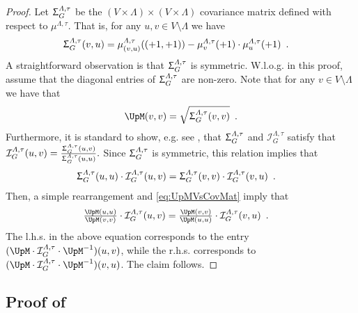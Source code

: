 \documentclass[11pt,reqno]{amsart}
\numberwithin{equation}{section}
\newcommand{\cI}{{\mathcal{I}}}
\newcommand{\electricviolet}[1]{{\color{electricviolet}#1}}
\newcommand{\red}[1]{{\color{red}#1}}
\newcommand{\infmatrix}{\cI}
\renewcommand{\electricviolet}[1]{#1}
\renewcommand{\red}[1]{#1}
\newcommand{\ku}{\red{u}}
\newcommand{\kv}{\electricviolet{v}}
\renewcommand{\ku}{u}
\renewcommand{\kv}{v}
\newcommand{\CovMatrix}{\Upsigma}
\begin{document}
\Isymsym*

\begin{proof}%
Let $\CovMatrix^{\Lambda,\tau}_G$ be the $(V\times \Lambda)\times (V\times \Lambda)$ covariance matrix defined with respect to $\mu^{\Lambda, \tau}$. That is, for any $u,v\in V\setminus \Lambda$ we have 
\begin{align}\nonumber
\CovMatrix^{\Lambda,\tau}_G(\kv,\ku) &=\mu^{\Lambda, \tau}_{(\kv,\ku)}((+1,+1))-\mu^{\Lambda, \tau}_{\kv}(+1)\cdot \mu^{\Lambda, \tau}_{\ku}(+1)\enspace. 
\end{align}
A straightforward observation is that $\CovMatrix^{\Lambda,\tau}_G$ is symmetric. W.l.o.g. in this proof, assume that 
the diagonal entries of $\CovMatrix^{\Lambda,\tau}_G$ are non-zero. 
%
Note that for any $\kv\in V\setminus \Lambda$ we have that
\begin{align}\label{eq:UpMVsCovMat}
\UpM(\kv,\kv)= \sqrt{\CovMatrix^{\Lambda,\tau}_G(\kv,\kv)}\enspace. 
\end{align}
Furthermore, it is standard to show, e.g. see \cite{VigodaSpectralInd}, that $\CovMatrix^{\Lambda,\tau}_G$ and 
$\infmatrix^{\Lambda,\tau}_G$ satisfy that 
% 
$\infmatrix^{\Lambda,\tau}_G(\ku,\kv)= \frac{\CovMatrix^{\Lambda,\tau}_G(\ku,\kv)}{\CovMatrix^{\Lambda,\tau}_G(\ku,\ku)}.$ 
% 
Since $\CovMatrix^{\Lambda,\tau}_G$ is symmetric, this relation implies that
\begin{align}\nonumber
\CovMatrix^{\Lambda,\tau}_G(\ku,\ku) \cdot \infmatrix^{\Lambda,\tau}_G(\ku,\kv) &
=\CovMatrix^{\Lambda,\tau}_G(\kv,\kv) \cdot \infmatrix^{\Lambda,\tau}_G(\kv,\ku) \enspace. 
\end{align}
Then, a simple rearrangement and \eqref{eq:UpMVsCovMat} imply that 
% 
% 
\begin{align}\nonumber
\textstyle \frac{\UpM(\ku,\ku)}{\UpM(\kv,\kv) } \cdot \infmatrix^{\Lambda,\tau}_G(\ku,\kv)& 
\textstyle = \frac{\UpM(\kv,\kv)}{\UpM(\ku,\ku) } \cdot \infmatrix^{\Lambda,\tau}_G(\kv,\ku) \enspace. 
\end{align}
The l.h.s. in the above equation corresponds to the entry 
$(\UpM\cdot \infmatrix^{\Lambda,\tau}_G \cdot \UpM^{-1})(\ku,\kv)$, while the r.h.s. corresponds to 
$(\UpM\cdot \infmatrix^{\Lambda,\tau}_G \cdot \UpM^{-1})(\kv,\ku)$.
%
The claim follows. 
\end{proof}
% 


\subsection{Proof of }\label{sec:claim:SigmaLVsPathNumber}
\end{document}
